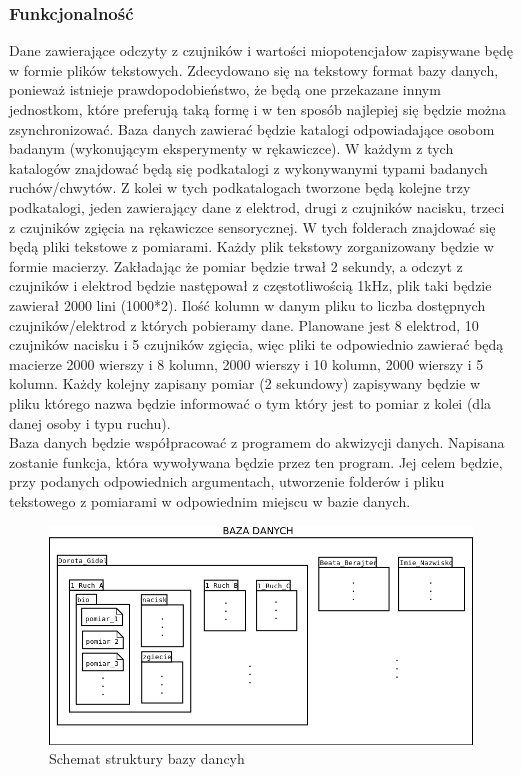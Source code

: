\documentclass{article}
\begin{document}
\subsubsection{Funkcjonalność}
Dane zawierające odczyty z czujników i wartości miopotencjałow zapisywane będę w formie plików tekstowych. Zdecydowano się na tekstowy format bazy danych, ponieważ istnieje prawdopodobieństwo, że będą one przekazane innym jednostkom, które preferują taką formę i w ten sposób najlepiej się będzie można zsynchronizować. Baza danych zawierać będzie katalogi odpowiadające osobom badanym (wykonującym eksperymenty w rękawiczce). W każdym z tych katalogów znajdować będą się podkatalogi z wykonywanymi typami badanych ruchów/chwytów. Z kolei w tych podkatalogach tworzone będą kolejne trzy podkatalogi, jeden zawierający dane z elektrod, drugi z czujników nacisku, trzeci z czujników zgięcia na rękawiczce sensorycznej. W tych folderach znajdować się będą pliki tekstowe z pomiarami. Każdy plik tekstowy zorganizowany będzie w formie macierzy. Zakładając że pomiar będzie trwał 2 sekundy, a odczyt z czujników i elektrod będzie następował z częstotliwością 1kHz, plik taki będzie zawierał 2000 lini (1000*2). Ilość kolumn w danym pliku to liczba dostępnych czujników/elektrod z których pobieramy dane. Planowane jest 8 elektrod, 10 czujników nacisku i 5 czujników zgięcia, więc pliki te odpowiednio zawierać będą macierze 2000 wierszy i 8 kolumn, 2000 wierszy i 10 kolumn, 2000 wierszy i 5 kolumn. Każdy kolejny zapisany pomiar (2 sekundowy) zapisywany będzie w pliku którego nazwa będzie informować o tym który jest to pomiar z kolei (dla danej osoby i typu ruchu). \\
Baza danych będzie współpracować z programem do akwizycji danych. Napisana zostanie funkcja, która wywoływana będzie przez ten program. Jej celem będzie, przy podanych odpowiednich argumentach, utworzenie folderów i pliku tekstowego z pomiarami w odpowiednim miejscu w bazie danych.

\begin{figure}[ht!]
\label{fig:baza_danych}
\centering
\includegraphics[width=14cm]{baza_danych.png}
\caption {Schemat struktury bazy dancyh}
\end{figure}
\end{document}
